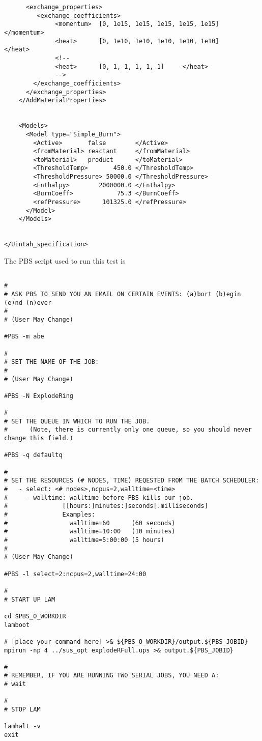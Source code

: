 \begin{verbatim}
      <exchange_properties>
         <exchange_coefficients>
              <momentum>  [0, 1e15, 1e15, 1e15, 1e15, 1e15]     </momentum>
              <heat>      [0, 1e10, 1e10, 1e10, 1e10, 1e10]     </heat>
              <!--
              <heat>      [0, 1, 1, 1, 1, 1]     </heat>
              -->
        </exchange_coefficients>
      </exchange_properties>
    </AddMaterialProperties>


    <Models>
      <Model type="Simple_Burn">
        <Active>       false        </Active>
        <fromMaterial> reactant     </fromMaterial>
        <toMaterial>   product      </toMaterial>
        <ThresholdTemp>       450.0 </ThresholdTemp>
        <ThresholdPressure> 50000.0 </ThresholdPressure>
        <Enthalpy>        2000000.0 </Enthalpy>
        <BurnCoeff>            75.3 </BurnCoeff>
        <refPressure>      101325.0 </refPressure>
      </Model>
    </Models>


</Uintah_specification>
  \end{verbatim}

The PBS script used to run this test  is
\begin{verbatim}

#
# ASK PBS TO SEND YOU AN EMAIL ON CERTAIN EVENTS: (a)bort (b)egin (e)nd (n)ever
#
# (User May Change)

#PBS -m abe

#
# SET THE NAME OF THE JOB:
#
# (User May Change)

#PBS -N ExplodeRing

#
# SET THE QUEUE IN WHICH TO RUN THE JOB.
#      (Note, there is currently only one queue, so you should never change this field.)

#PBS -q defaultq

#
# SET THE RESOURCES (# NODES, TIME) REQESTED FROM THE BATCH SCHEDULER:
#   - select: <# nodes>,ncpus=2,walltime=<time>
#     - walltime: walltime before PBS kills our job.
#               [[hours:]minutes:]seconds[.milliseconds]
#               Examples:
#                 walltime=60      (60 seconds)
#                 walltime=10:00   (10 minutes)
#                 walltime=5:00:00 (5 hours)
#
# (User May Change)

#PBS -l select=2:ncpus=2,walltime=24:00

#
# START UP LAM

cd $PBS_O_WORKDIR
lamboot

# [place your command here] >& ${PBS_O_WORKDIR}/output.${PBS_JOBID}
mpirun -np 4 ../sus_opt explodeRFull.ups >& output.${PBS_JOBID}

#
# REMEMBER, IF YOU ARE RUNNING TWO SERIAL JOBS, YOU NEED A:
# wait

#
# STOP LAM

lamhalt -v
exit
\end{verbatim}

  
  


